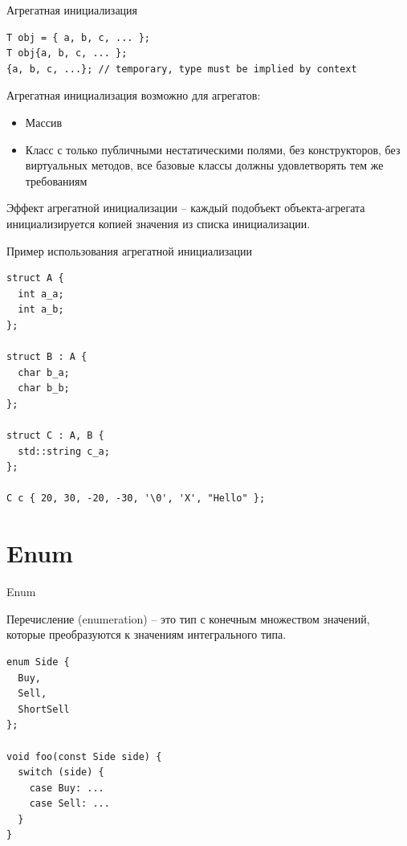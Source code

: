 \documentclass[unknownkeysallowed,xcolor=table]{beamer}
\begin{document}
\begin{frame}[fragile]{Агрегатная инициализация}

\begin{lstlisting}
T obj = { a, b, c, ... };
T obj{a, b, c, ... };
{a, b, c, ...}; // temporary, type must be implied by context
\end{lstlisting}

\vspace{1em}

Агрегатная инициализация возможно для агрегатов:
\begin{itemize}
  \item Массив
  \item Класс с только публичными нестатическими полями, без конструкторов, без виртуальных методов, все базовые классы должны удовлетворять тем же требованиям
\end{itemize}

\vspace{1em}

Эффект агрегатной инициализации -- каждый подобъект объекта-агрегата инициализируется копией значения из списка инициализации.

\end{frame}

\begin{frame}[fragile]{Пример использования агрегатной инициализации}

\begin{lstlisting}
struct A {
  int a_a;
  int a_b;
};

struct B : A {
  char b_a;
  char b_b;
};

struct C : A, B {
  std::string c_a;
};

C c { 20, 30, -20, -30, '\0', 'X', "Hello" };
\end{lstlisting}

\end{frame}


\section{Enum}

\begin{frame}[fragile]{Enum}

Перечисление (enumeration) -- это тип с конечным множеством значений, которые преобразуются к значениям интегрального типа.

\vspace{1em}

\begin{lstlisting}
enum Side {
  Buy,
  Sell,
  ShortSell
};

void foo(const Side side) {
  switch (side) {
    case Buy: ...
    case Sell: ...
  }
}
\end{lstlisting}

\end{frame}
\end{document}
